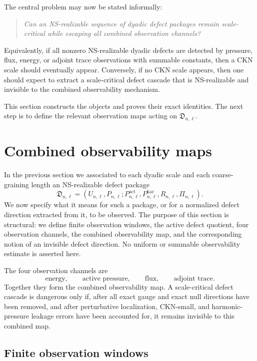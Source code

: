 \documentclass[11pt]{article}
\numberwithin{equation}{section}
\theoremstyle{plain}
\theoremstyle{definition}
\theoremstyle{remark}
\newcommand{\har}{\mathrm{har}}
\newcommand{\frakD}{\mathfrak D}
\newcommand{\act}{\mathrm{act}}
\begin{document}
The central problem may now be stated informally:
\begin{quote}
\centering
\textit{Can an NS-realizable sequence of dyadic defect packages remain scale-critical while escaping all combined observation channels?}
\end{quote}
Equivalently, if all nonzero NS-realizable dyadic defects are detected by pressure, flux, energy, or adjoint trace observations with summable constants, then a CKN scale should eventually appear.  Conversely, if no CKN scale appears, then one should expect to extract a scale-critical defect cascade that is NS-realizable and invisible to the combined observability mechanism.

This section constructs the objects and proves their exact identities.  The next step is to define the relevant observation maps acting on \(\frakD_{n,\ell}\).


\section{Combined observability maps}
\label{sec:combined-observability}

In the previous section we associated to each dyadic scale and each coarse-graining length an NS-realizable defect package
\[
  \frakD_{n,\ell}=
  \left(U_{n,\ell},P_{n,\ell};P^{\act}_{n,\ell},P^{\har}_{n,\ell},R_{n,\ell},\Pi_{n,\ell}\right).
\]
We now specify what it means for such a package, or for a normalized defect direction extracted from it, to be observed.  The purpose of this section is structural: we define finite observation windows, the active defect quotient, four observation channels, the combined observability map, and the corresponding notion of an invisible defect direction.  No uniform or summable observability estimate is asserted here.

The four observation channels are
\[
  \text{energy},
  \qquad
  \text{active pressure},
  \qquad
  \text{flux},
  \qquad
  \text{adjoint trace}.
\]
Together they form the combined observability map.  A scale-critical defect cascade is dangerous only if, after all exact gauge and exact null directions have been removed, and after perturbative localization, CKN-small, and harmonic-pressure leakage errors have been accounted for, it remains invisible to this combined map.

\subsection{Finite observation windows}
\end{document}
